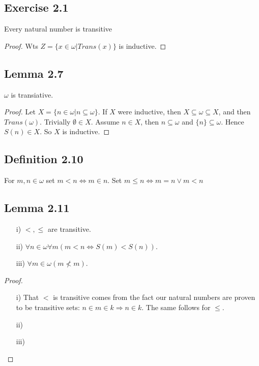 \documentclass[a4paper, 12pt, twoside]{article}
\begin{document}
\subsection*{Exercise 2.1}
Every natural number is transitive
\begin{proof}
    Wts $Z=\{x\in\omega|Trans(x)\}$ is inductive.
\end{proof}
\subsection*{Lemma 2.7}
$\omega$ is transiative.
\begin{proof}
    Let $X=\{n\in\omega|n\subseteq\omega\}$. If $X$ were inductive, then $X\subseteq\omega\subseteq X$, and then $Trans(\omega)$. Trivially $\emptyset\in X$. Assume $n\in X$, then $n\subseteq \omega$ and $\{n\}\subseteq\omega$. Hence $S(n)\in X$. So $X$ is inductive.
\end{proof}
\subsection*{Definition 2.10}
For $m,n\in\omega$ set $m<n\iff m\in n$. Set $m\leq n \iff m=n\vee m<n$
\subsection*{Lemma 2.11}
\begin{itemize}
    \item[i)] $<, \leq$ are transitive.
    \item[ii)] $\forall n\in\omega \forall m(m<n\iff S(m)<S(n))$.
    \item[iii)] $\forall m\in\omega(m\not<m)$.
\end{itemize}
\begin{proof}
    \begin{itemize}
        \item[i)] That $<$ is transitive comes from the fact our natural numbers are proven to be transitive sets: $n\in m\in k\Rightarrow n\in k$. The same follows for $\leq$.

        \item[ii)]
        \item[iii)]
    \end{itemize}
\end{proof}
\end{document}
